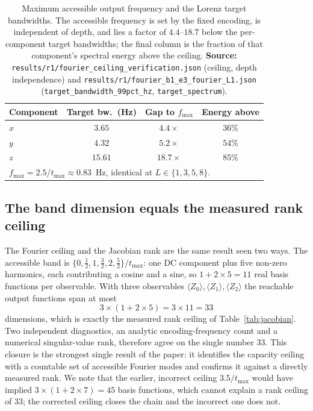 \documentclass[a4paper,12pt]{iopart}
\newcommand{\Zexp}[1]{\langle Z_{#1}\rangle}
\begin{document}
\begin{table}[htbp]
  \centering
  \caption{Maximum accessible output frequency and the Lorenz target bandwidths.
    The accessible frequency is set by the fixed encoding, is independent of
    depth, and lies a factor of $4.4$--$18.7$ below the per-component target
    bandwidths; the final column is the fraction of that component's spectral
    energy above the ceiling. \textbf{Source:}
    \texttt{results/r1/fourier\_ceiling\_verification.json} (ceiling, depth
    independence) and
    \texttt{results/r1/fourier\_b1\_e3\_fourier\_L1.json}
    (\texttt{target\_bandwidth\_99pct\_hz}, \texttt{target\_spectrum}).}
  \label{tab:fourier}
  \begin{tabular}{lccc}
    \toprule
    Component & Target bw.\ (Hz) & Gap to $f_{\max}$ & Energy above \\
    \midrule
    $x$ & $3.65$  & $4.4\times$  & $36\%$ \\
    $y$ & $4.32$  & $5.2\times$  & $54\%$ \\
    $z$ & $15.61$ & $18.7\times$ & $85\%$ \\
    \midrule
    \multicolumn{4}{l}{$f_{\max} = 2.5/t_{\max} \approx 0.83$~Hz, identical at
      $L\in\{1,3,5,8\}$.} \\
    \bottomrule
  \end{tabular}
\end{table}

\subsection{The band dimension equals the measured rank ceiling}
\label{ssec:closure}

The Fourier ceiling and the Jacobian rank are the same result seen two ways. The
accessible band is $\{0,\tfrac12,1,\tfrac32,2,\tfrac52\}/t_{\max}$: one DC
component plus five non-zero harmonics, each contributing a cosine and a sine, so
$1+2\times5=11$ real basis functions per observable. With three observables
$\Zexp{0},\Zexp{1},\Zexp{2}$ the reachable output functions span at most
\begin{equation}
  3\times(1 + 2\times5) = 3\times 11 = 33
\end{equation}
dimensions, which is exactly the measured rank ceiling of
Table~\ref{tab:jacobian}. Two independent diagnostics, an analytic
encoding-frequency count and a numerical singular-value rank, therefore agree on
the single number $33$. This closure is the strongest single result of the
paper: it identifies the capacity ceiling with a countable set of accessible
Fourier modes and confirms it against a directly measured rank. We note that the
earlier, incorrect ceiling $3.5/t_{\max}$ would have implied $3\times(1+2\times7)
=45$ basis functions, which cannot explain a rank ceiling of $33$; the corrected
ceiling closes the chain and the incorrect one does not.
\end{document}
